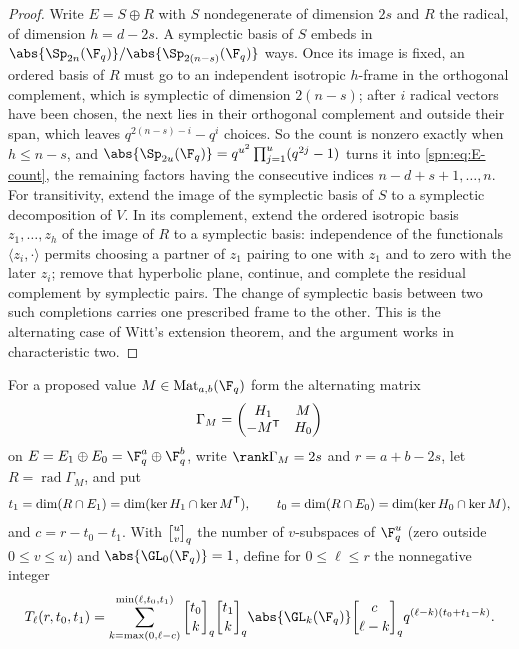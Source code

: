 \begin{proof}
Write $E=S\oplus R$ with $S$ nondegenerate of dimension $2s$ and $R$ the
radical, of dimension $h=d-2s$. A symplectic basis of $S$ embeds in
$\abs{\Sp_{2n}(\F_q)}/\abs{\Sp_{2(n-s)}(\F_q)}$ ways. Once its image is fixed,
an ordered basis of $R$ must go to an independent isotropic $h$-frame in the
orthogonal complement, which is symplectic of dimension $2(n-s)$; after $i$
radical vectors have been chosen, the next lies in their orthogonal complement
and outside their span, which leaves $q^{2(n-s)-i}-q^i$ choices. So the count is
nonzero exactly when $h\le n-s$, and
$\abs{\Sp_{2u}(\F_q)}=q^{u^2}\prod_{j=1}^u(q^{2j}-1)$ turns it into
\eqref{spn:eq:E-count}, the remaining factors having the consecutive indices
$n-d+s+1,\dots,n$. For transitivity, extend the image of the symplectic basis
of $S$ to a symplectic decomposition of $V$. In its complement, extend the
ordered isotropic basis $z_1,\dots,z_h$ of the image of $R$ to a symplectic
basis: independence of the functionals $\langle z_i,\cdot\rangle$ permits
choosing a partner of $z_1$ pairing to one with $z_1$ and to zero with the
later $z_i$; remove that hyperbolic plane, continue, and complete the residual
complement by symplectic pairs. The change of symplectic basis between two
such completions carries one prescribed frame to the other. This is the
alternating case of Witt's extension theorem, and the argument works in
characteristic two.
\end{proof}

For a proposed value $M\in\spnMat_{a,b}(\F_q)$ form the alternating matrix
\begin{equation}\label{spn:eq:combined-gram}
 \Gamma_M=\begin{pmatrix}H_1&M\\-M^{\mathsf{T}}&H_0\end{pmatrix}
\end{equation}
on $E=E_1\oplus E_0=\F_q^a\oplus\F_q^b$, write $\rank\Gamma_M=2s$ and
$r=a+b-2s$, let $R=\operatorname{rad}\Gamma_M$, and put
\[
 t_1=\dim(R\cap E_1)=\dim(\ker H_1\cap\ker M^{\mathsf{T}}),\qquad
 t_0=\dim(R\cap E_0)=\dim(\ker H_0\cap\ker M),
\]
and $c=r-t_0-t_1$.
With $\spnqbin uvq$ the number of $v$-subspaces of $\F_q^u$ (zero outside
$0\le v\le u$) and $\abs{\GL_0(\F_q)}=1$, define for $0\le\ell\le r$ the
nonnegative integer
\begin{equation}\label{spn:eq:T-count}
 T_\ell(r,t_0,t_1)=\sum_{k=\max(0,\ell-c)}^{\min(\ell,t_0,t_1)}
 \spnqbin{t_0}kq\spnqbin{t_1}kq\abs{\GL_k(\F_q)}\spnqbin{c}{\ell-k}q
 q^{(\ell-k)(t_0+t_1-k)} .
\end{equation}

